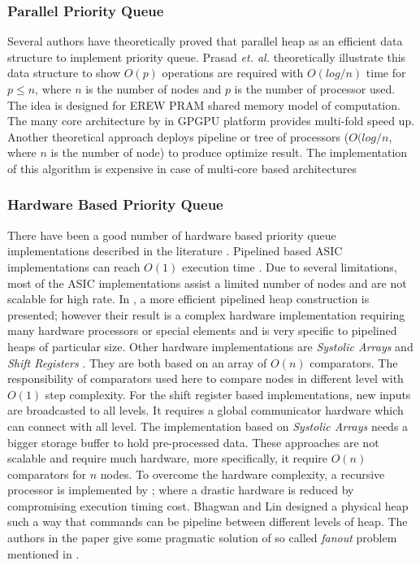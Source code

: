 \documentclass[10pt, conference, compsocconf]{IEEEtran}
\begin{document}
\subsubsection{Parallel Priority Queue}
Several authors have theoretically proved that parallel heap as an efficient data structure to implement priority queue. Prasad {\it et. al.} \cite{pq0,pq3} theoretically illustrate this data structure to show $O(p)$ operations are required with $O(log / n)$ time for $p \leq n$, where $n$ is the number of nodes and $p$ is the number of processor used. The idea is designed for EREW PRAM shared memory model of computation. The many core architecture by \cite{pq2} in GPGPU platform provides multi-fold speed up. Another theoretical approach \cite{pq4} deploys pipeline or tree of processors ($O(log / n$, where $n$ is the number of node) to produce optimize result. The implementation of this algorithm \cite{pq5} is expensive in case of multi-core based architectures

\subsubsection{Hardware Based Priority Queue}
There have been a good number of hardware based priority queue implementations described in the literature \cite{hw1,hw2,hw3,hw5,hw6,hw7,hw8,hw9}.  Pipelined based ASIC implementations can reach $O(1)$ execution time \cite{hw5,hw6}. Due to several limitations, most of the ASIC implementations assist a limited number of nodes and are not scalable for high rate. In \cite{hw7}, a more efficient pipelined heap construction is presented; however their result is a complex hardware implementation requiring many hardware processors or special elements and is very specific to pipelined heaps of particular size. Other hardware implementations are {\it Systolic Arrays} and {\it Shift Registers} \cite{hw8,hw9}. They are both based on an array of $O(n)$ comparators. The responsibility of comparators used here to compare nodes in different level with $O(1)$ step complexity. For the shift register \cite{hw9} based implementations, new inputs are broadcasted to all levels. It requires a global communicator hardware which can connect with all level. The implementation based on {\it Systolic Arrays} \cite{hw8} needs a bigger storage buffer to hold pre-processed data. These approaches are not scalable and require much hardware, more specifically, it require $O(n)$ comparators for $n$ nodes. To overcome the hardware complexity, a recursive processor is implemented by \cite{hw10}; where a drastic hardware is reduced by compromising execution timing cost. Bhagwan and Lin \cite{hw2} designed a physical heap such a way that commands can be pipeline between different levels of heap. The authors in the paper \cite{hw1} give some pragmatic solution of so called {\it fanout} problem mentioned in \cite{hw3}.
\end{document}
